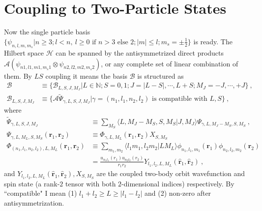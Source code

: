 \documentclass{article}
\begin{document}
\section{Coupling to Two-Particle States}
Now the single particle basis $\{\psi_{n,l,m,m_s} | n \geq 3; l<n,~l\geq 0 \text{ if } n>3 \text{ else } 2; |m|\leq l; m_s=\pm\frac{1}{2}\}$ is ready. The Hilbert space $\mathcal H$ can be spanned by the antisymmetrized direct products ${\mathcal{A}(\psi_{n1,l1,m1,m_s1}\otimes\psi_{n2,l2,m2,m_s2})}$, or any complete set of linear combination of them. By $LS$ coupling it means the basis $\mathcal B$ is structured as
\begin{align}
\mathcal B &\equiv \{\mathcal B_{L,S,J,M_J}|L\in\mathbb{N};S=0,1;J=|L-S|,\cdots,L+S; M_J = -J,\cdots,+J\}~,\\
\mathcal B_{L,S,J,M_J} &\equiv \{\mathcal A\tilde\Psi_{\gamma,L,S,J,M_J}|\gamma=(n_1,l_1,n_2,l_2)\text{ is compatible with }L,S\}~,
\end{align}
where
\begin{align}
\tilde\Psi_{\gamma,L,S,J,M_J}&\equiv\sum_{M_S}\langle L,M_J-M_S,S,M_S | J,M_J\rangle\Psi_{\gamma,L,M_J-M_S,S,M_S}~,\\
\Psi_{\gamma,L,M_L,S,M_S}(\bm{r}_1,\bm{r}_2) &\equiv \Phi_{\gamma,L,M_L}(\bm{r}_1,\bm{r}_2) X_{S,M_S}\\
\Phi_{(n_1,l_1,n_2,l_2),L,M_L}(\bm{r}_1,\bm{r}_2) &\equiv \sum_{m_1,m_2}\langle l_1m_1,l_2m_2 | LM_L\rangle \phi_{n_1,l_1,m_1}(\bm{r}_1) \phi_{n_2,l_2,m_2}(\bm{r}_2) \nonumber\\
&= \frac{u_{n_1l_1}(r_1)u_{n_2l_2}(r_2)}{r_1r_2}Y_{l_1,l_2,L,M_L}(\bm{\hat r}_1,\bm{\hat r}_2)\label{eq:Psi-orbit}~,
\end{align}
and $Y_{l_1,l_2,L,M_L}(\bm{\hat r}_1,\bm{\hat r}_2), X_{S,M_S}$ are the coupled two-body orbit wavefunction and spin state (a rank-$2$ tensor with both $2$-dimensional indices) respectively. By ``compatible" I mean (1) $l_1+l_2 \geq L \geq |l_1-l_2|$ and (2) non-zero after antisymmetrization.
\end{document}
